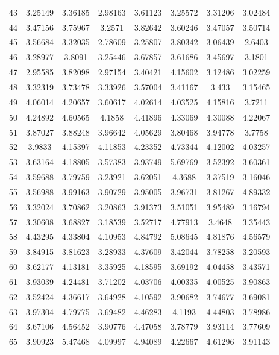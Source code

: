 \begin{center}
\begin{longtable}{cccccccc}
43 & 3.25149 & 3.36185 & 2.98163 & 3.61123 & 3.25572 & 3.31206 & 3.02484\\
44 & 3.47156 & 3.75967 & 3.2571 & 3.82642 & 3.60246 & 3.47057 & 3.50714\\
45 & 3.56684 & 3.32035 & 2.78609 & 3.25807 & 3.80342 & 3.06439 & 2.6403\\
46 & 3.28977 & 3.8091 & 3.25446 & 3.67857 & 3.61686 & 3.45697 & 3.1801\\
47 & 2.95585 & 3.82098 & 2.97154 & 3.40421 & 4.15602 & 3.12486 & 3.02259\\
48 & 3.32319 & 3.73478 & 3.33926 & 3.57004 & 3.41167 & 3.433 & 3.15465\\
49 & 4.06014 & 4.20657 & 3.60617 & 4.02614 & 4.03525 & 4.15816 & 3.7211\\
50 & 4.24892 & 4.60565 & 4.1858 & 4.41896 & 4.33069 & 4.30088 & 4.22067\\
51 & 3.87027 & 3.88248 & 3.96642 & 4.05629 & 3.80468 & 3.94778 & 3.7758\\
52 & 3.9833 & 4.15397 & 4.11853 & 4.23352 & 4.73344 & 4.12002 & 4.03257\\
53 & 3.63164 & 4.18805 & 3.57383 & 3.93749 & 5.69769 & 3.52392 & 3.60361\\
54 & 3.59688 & 3.79759 & 3.23921 & 3.62051 & 4.3688 & 3.37519 & 3.16046\\
55 & 3.56988 & 3.99163 & 3.90729 & 3.95005 & 3.96731 & 3.81267 & 4.89332\\
56 & 3.32024 & 3.70862 & 3.20863 & 3.91373 & 3.51051 & 3.95489 & 3.16794\\
57 & 3.30608 & 3.68827 & 3.18539 & 3.52717 & 4.77913 & 3.4648 & 3.35443\\
58 & 4.43295 & 4.33804 & 4.10953 & 4.84792 & 5.08645 & 4.81876 & 4.56579\\
59 & 3.84915 & 3.81623 & 3.28933 & 4.37609 & 3.42044 & 3.78258 & 3.20593\\
60 & 3.62177 & 4.13181 & 3.35925 & 4.18595 & 3.69192 & 4.04458 & 3.43571\\
61 & 3.93039 & 4.24481 & 3.71202 & 4.03706 & 4.00335 & 4.00525 & 3.90863\\
62 & 3.52424 & 4.36617 & 3.64928 & 4.10592 & 3.90682 & 3.74677 & 3.69081\\
63 & 3.97304 & 4.79775 & 3.69482 & 4.46283 & 4.1193 & 4.44803 & 3.78986\\
64 & 3.67106 & 4.56452 & 3.90776 & 4.47058 & 3.78779 & 3.93114 & 3.77609\\
65 & 3.90923 & 5.47468 & 4.09997 & 4.94089 & 4.22667 & 4.61296 & 3.91143\\

\end{longtable}
\end{center}
